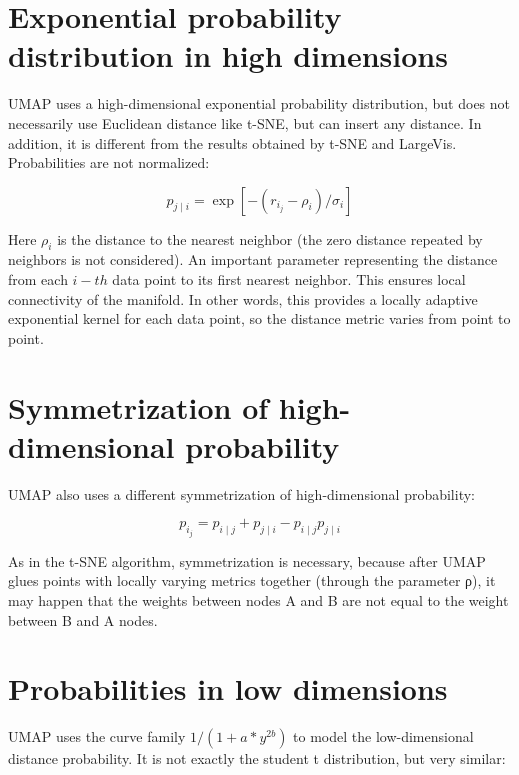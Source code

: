 \section{Exponential probability distribution in high dimensions}

UMAP uses a high-dimensional exponential probability distribution, but does not necessarily use Euclidean distance like t-SNE, but can insert any distance. In addition, it is different from the results obtained by t-SNE and LargeVis. Probabilities are not normalized:

\begin{equation*}
    {p_{j\mid i}} = \exp {[−(r_i_j− \rho_i)/\sigma_i]} 
\end{equation*}

\noindent Here $\rho_i$ is the distance to the nearest neighbor (the zero distance repeated by neighbors is not considered). An important parameter representing the distance from each $i-th$ data point to its first nearest neighbor. This ensures local connectivity of the manifold. In other words, this provides a locally adaptive exponential kernel for each data point, so the distance metric varies from point to point. \\

\section{Symmetrization of high-dimensional probability}

UMAP also uses a different symmetrization of high-dimensional probability:

\begin{equation*}
    {p_i_j} = p_{i\mid j} + p_{j\mid i} - p_{i\mid j}p_{j\mid i}
\end{equation*}

\noindent As in the t-SNE algorithm, symmetrization is necessary, because after UMAP glues points with locally varying metrics together (through the parameter ρ), it may happen that the weights between nodes A and B are not equal to the weight between B and A nodes.

\section{Probabilities in low dimensions}

\noindent  UMAP uses the curve family $1/(1+ a * y ^{2b})$ to model the low-dimensional distance probability. It is not exactly the student t distribution, but very similar:

